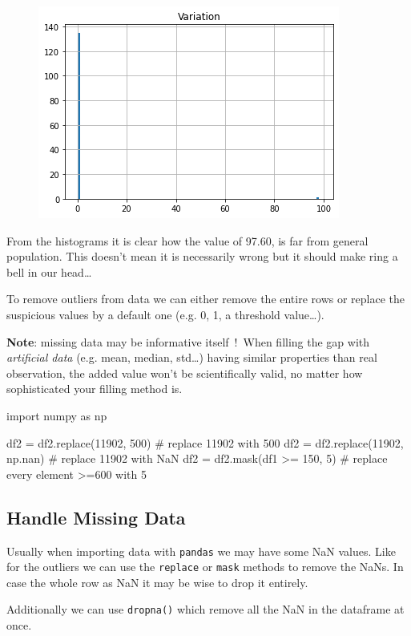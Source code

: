 \begin{figure}
	\centering
	\includegraphics[width=0.7\linewidth]{figures/volume_plot}
\end{figure}

From the histograms it is clear how the value of 97.60, is far from general population. This doesn't mean it is necessarily wrong but it should make ring a bell in our head\ldots

To remove outliers from data we can either remove the entire rows or replace the suspicious values by a default one 
(e.g. 0, 1, a threshold value\ldots).

\textbf{Note}: missing data may be informative itself~!~When filling the gap with \emph{artificial data} (e.g. mean, median, std\ldots) having similar properties than real observation, the added value won't be scientifically valid, no matter how sophisticated your filling method is.

\begin{ipython}
import numpy as np

df2 = df2.replace(11902, 500) # replace 11902 with 500
df2 = df2.replace(11902, np.nan) # replace 11902 with NaN
df2 = df2.mask(df1 >= 150, 5) # replace every element >=600 with 5
\end{ipython}

\subsection{Handle Missing Data}\label{handle-missing-data}

Usually when importing data with \texttt{pandas} we may have some NaN values. Like for the outliers we can use the \texttt{replace} or \texttt{mask} methods to remove the NaNs. In case the whole row as NaN it may be wise to drop it entirely.

Additionally we can use \texttt{dropna()} which remove all the NaN in the dataframe at once.

